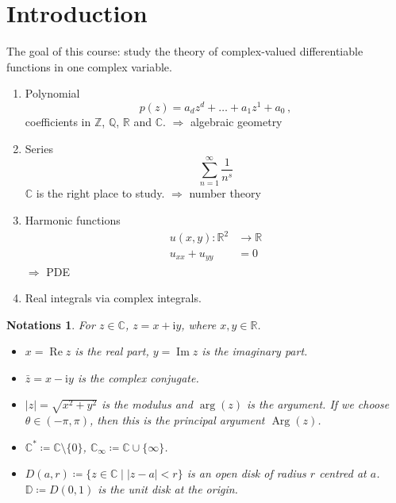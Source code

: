 \documentclass{article}
\theoremstyle{plain}\theoremheaderfont{\normalfont\itshape}\theorembodyfont{\rmfamily}\theoremseparator{.}\newtheorem*{rem}{Remark}\newtheorem*{ex}{Example}\newtheorem*{proof}{Proof}\newtheorem*{altp}{Alternative proof}\newtheorem*{con}{Consequences}\newtheorem*{notn}{Notations}\newtheorem*{cau}{Caution}\newtheorem*{term}{Terminology}\newtheorem*{keyex}{Key example}
\theoremstyle{plain}\theoremheaderfont{\normalfont\bfseries}\theorembodyfont{\rmfamily}\theoremseparator{.}\newtheorem{thm}{Theorem}[section]\newtheorem{lem}[thm]{Lemma}\newtheorem{prop}[thm]{Proposition}\newtheorem*{cor}{Corollary}\newtheorem{defn}[thm]{Definition}\newtheorem{clm}[thm]{Claim}\newtheorem{clminproof}{Claim}\newtheorem{leminproof}{Lemma}\newtheorem{app}{Application}
\theoremstyle{break}\theoremheaderfont{\normalfont\itshape}\theorembodyfont{\rmfamily}\theoremseparator{.\medskip}\newtheorem*{proofskip}{Proof}\newtheorem*{exs}{Examples}\newtheorem*{rems}{Remarks}\newtheorem*{rec}{Recall}\newtheorem*{ppts}{Properties}
\theoremstyle{break}\theoremheaderfont{\normalfont\bfseries}\theorembodyfont{\rmfamily}\theoremseparator{.\medskip}\newtheorem{lemskip}[thm]{Lemma}\newtheorem{defnskip}[thm]{Definition}\newtheorem{propskip}[thm]{Proposition}\newtheorem{thmskip}[thm]{Theorem}
\numberwithin{equation}{section}
\newcommand{\ii}{\mathrm{i}}
\DeclareMathOperator*{\Arg}{Arg}
\newcommand{\abs}[1]{\left|#1\right|}
\newcommand{\ZZ}{\mathbb{Z}}
\newcommand{\QQ}{\mathbb{Q}}
\newcommand{\RR}{\mathbb{R}}
\newcommand{\CC}{\mathbb{C}}
\newcommand{\DD}{\mathbb{D}}
\renewcommand{\Re}{\operatorname{Re}}
\renewcommand{\Im}{\operatorname{Im}}
\begin{document}
    \section{Introduction}
    The goal of this course: study the theory of complex-valued differentiable functions in one complex variable.
    \begin{enumerate}[topsep=0pt,label=(\roman*)]
        \item Polynomial
        \[ p(z)=a_dz^d+\dots+a_1z^1+a_0\,, \]
        coefficients in \(\ZZ\), \(\QQ\), \(\RR\) and \(\CC\). \hfill \(\Rightarrow\) algebraic geometry
        \item Series
        \[ \sum_{n=1}^{\infty}\frac{1}{n^s} \]
        \(\CC\) is the right place to study. \hfill \(\Rightarrow\) number theory
        \item Harmonic functions
        \begin{align*}
            u(x,y):\RR^2&\to\RR\\
            u_{xx}+u_{yy}&=0
        \end{align*}
        \hfill\(\Rightarrow\) PDE
        \item Real integrals via complex integrals.
    \end{enumerate}
    \begin{notn}
        For \(z\in\CC\), \(z=x+\ii y\), where \(x,y\in\RR\).
        \begin{itemize}[topsep=0pt]
            \item \(x=\Re z\) is the real part, \(y=\Im z\) is the imaginary part.
            \item \(\bar{z}=x-\ii y\) is the complex conjugate.
            \item \(\abs{z}=\sqrt{x^2+y^2}\) is the modulus and \(\arg(z)\) is the argument. If we choose \(\theta\in(-\pi,\pi)\), then this is the principal argument \(\Arg(z)\).
            \item \(\CC^*\coloneqq\CC\setminus\{0\}\), \(\CC_\infty\coloneqq\CC\cup\{\infty\}\).
            \item \( D(a,r)\coloneqq\{z\in\mathbb{C}\mid\abs{z-a}<r\}\) is an open disk of radius \(r\) centred at \(a\). \(\DD\coloneqq D(0,1)\) is the unit disk at the origin.
        \end{itemize}
    \end{notn}
\end{document}
